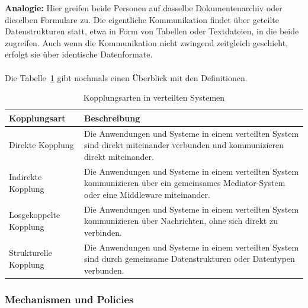 \documentclass[../vs-script-first-v01.tex]{subfiles}
\begin{document}
\textbf{Analogie:} 
Hier greifen beide Personen auf dasselbe Dokumentenarchiv oder dieselben Formulare zu. Die eigentliche Kommunikation findet über geteilte Datenstrukturen statt, etwa in Form von Tabellen oder Textdateien, in die beide zugreifen. Auch wenn die Kommunikation nicht zwingend zeitgleich geschieht, erfolgt sie über identische Datenformate.
\\\\
Die Tabelle~\ref{tab:kopplungsarten} gibt nochmals einen Überblick mit den Definitionen. 
\begin{table}[!ht]
  \centering
  \caption{Kopplungsarten in verteilten Systemen}
  \label{tab:kopplungsarten}
  \begin{tabular}{|p{4cm}|p{7cm}|}
    \hline
    \textbf{Kopplungsart} & \textbf{Beschreibung} \\ \hline
    Direkte Kopplung & Die Anwendungen und Systeme in einem verteilten System sind direkt miteinander verbunden und kommunizieren direkt miteinander. \\ \hline
    Indirekte Kopplung & Die Anwendungen und Systeme in einem verteilten System kommunizieren über ein gemeinsames Mediator-System oder eine Middleware miteinander. \\ \hline
    Losgekoppelte Kopplung & Die Anwendungen und Systeme in einem verteilten System kommunizieren über Nachrichten, ohne sich direkt zu verbinden. \\ \hline
    Strukturelle Kopplung & Die Anwendungen und Systeme in einem verteilten System sind durch gemeinsame Datenstrukturen oder Datentypen verbunden. \\ \hline
  \end{tabular}
\end{table}
\newpage
\subsubsection{Mechanismen und Policies}
\end{document}
